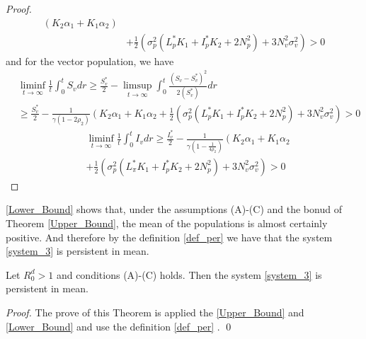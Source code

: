 \begin{proof}
\begin{align*}
	 	\left(
	 		K_2 \alpha_1 + 
	 		K_1 \alpha_2 
	 	\right)
	 	\\
 		&+
 		\frac{1}{2}
 		\left(
 			\sigma_p ^ 2
 			(
 				L_p ^* K_1 + 
 				I_p ^* K_2 + 
 				2 N_p ^ 2
 			) + 
 			3 N_v ^ 2
 			\sigma_v ^ 2
 		\right)>0
	\end{align*}
	and for the vector population, we have
	\begin{align*}
	 	&
	 	\liminf
	 	\limits_{t \to \infty}
	 	\frac{1}{t}
	 	\int_{0} ^ {t} 
	 		S_v 
	 	dr
	 	\geq
	 	\frac{S_v^*}{2}
	 	-
	 	\limsup_{t\to \infty}
	 	\int_{0} ^ {t}
	 	\frac{(S_v - S_v^*) ^ 2}{2 (S_v ^* )}dr
	 	\\
	 	&\geq
	 	\frac{S_v ^* }{2} - 
	 	\frac{1}{\gamma(1-2\rho_2)}
	 	\left(
	 		K_2 \alpha_1 + 
	 		K_1 \alpha_2
	 	\right.+
 		\frac{1}{2}
 		\left(
 			\sigma_p^2
 			(
 				L_p ^* K_1 + 
 				I_p ^* K_2 + 
 				2N_p ^2
 			) + 
 			3N_v ^ 2
 			\sigma_v ^ 2
 		\right) >0
	\end{align*}
%
 \begin{align*}
	 	&
	 	\liminf\limits_{t \to \infty}
	 	\frac{1}{t}\int_{0}^{t} I_v dr
	 	\geq
 		\frac{I_v^*}{2} - 
 		\frac{1}{
 			\gamma
 			(
 				1 - 
 				\frac{1}{4\rho_2}
 			)}
 		\left(
 			K_2 \alpha_1 + 
 			K_1 \alpha_2
 		\right.\\
	 	&+
	 	\frac{1}{2}
	 	\left(
	 		\sigma_p ^ 2
	 		(
	 			L_\pi ^* K_1 + 
	 			I_p ^ *K_2 + 
	 			2N_p ^ 2
	 		) + 
	 		3N_v ^ 2
	 		\sigma_v ^ 2
	 	\right)
	 	>0
 \end{align*}
\end{proof}
%
\begin{remark}
	\autoref{Lower_Bound} shows that, under the assumptions (A)-(C)
	and the bonud of Theorem \ref{Upper_Bound}, the mean of the 
	populations is almost certainly positive. And therefore by the 
	definition \ref{def_per} we have that the system 
	\eqref{system_3} is persistent in mean.
\end{remark}
%
\begin{theorem}
	Let $R^d_0>1$ and conditions (A)-(C) holds. 
	Then the system \eqref{system_3} is persistent in mean.
\end{theorem}
\begin{proof}
	The prove of this Theorem is applied the
	\autoref{Upper_Bound} and 
	\ref{Lower_Bound} and use the definition \ref{def_per} .
	\qed
\end{proof}
